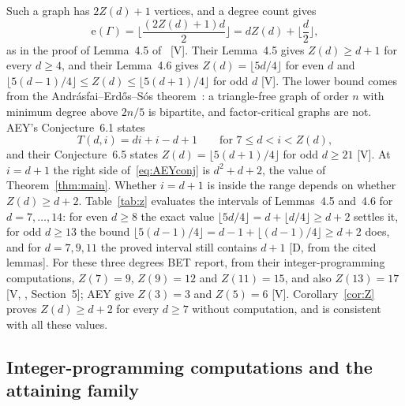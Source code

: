 \documentclass[11pt]{article}
\theoremstyle{remark}
\newcommand{\e}{\mathrm{e}}
\begin{document}
Such a graph has $2Z(d)+1$ vertices, and a degree count gives
\begin{equation}\label{eq:Zedges}
\e(\Gamma)=\Big\lfloor\frac{(2Z(d)+1)d}{2}\Big\rfloor=dZ(d)+\Big\lfloor\frac d2\Big\rfloor,
\end{equation}
as in the proof of Lemma~4.5 of~\cite{AEY} [V]. Their Lemma~4.5 gives $Z(d)\ge d+1$ for every $d\ge4$, and their Lemma~4.6 gives $Z(d)=\lfloor5d/4\rfloor$ for even $d$ and $\lfloor5(d-1)/4\rfloor\le Z(d)\le\lfloor5(d+1)/4\rfloor$ for odd $d$ [V]. The lower bound comes from the Andr\'asfai--Erd\H{o}s--S\'os theorem~\cite{AES}: a triangle-free graph of order $n$ with minimum degree above $2n/5$ is bipartite, and factor-critical graphs are not. AEY's Conjecture~6.1 states
\begin{equation}\label{eq:AEYconj}
T(d,i)=di+i-d+1\qquad\text{for }7\le d<i<Z(d),
\end{equation}
and their Conjecture~6.5 states $Z(d)=\lfloor5(d+1)/4\rfloor$ for odd $d\ge21$ [V]. At $i=d+1$ the right side of~\eqref{eq:AEYconj} is $d^2+d+2$, the value of Theorem~\ref{thm:main}. Whether $i=d+1$ is inside the range depends on whether $Z(d)\ge d+2$. Table~\ref{tab:z} evaluates the intervals of Lemmas~4.5 and~4.6 for $d=7,\ldots,14$: for even $d\ge8$ the exact value $\lfloor5d/4\rfloor=d+\lfloor d/4\rfloor\ge d+2$ settles it, for odd $d\ge13$ the bound $\lfloor5(d-1)/4\rfloor=d-1+\lfloor(d-1)/4\rfloor\ge d+2$ does, and for $d=7,9,11$ the proved interval still contains $d+1$ [D, from the cited lemmas]. For these three degrees BET report, from their integer-programming computations, $Z(7)=9$, $Z(9)=12$ and $Z(11)=15$, and also $Z(13)=17$ [V, \cite{BET}, Section~5]; AEY give $Z(3)=3$ and $Z(5)=6$ [V]. Corollary~\ref{cor:Z} proves $Z(d)\ge d+2$ for every $d\ge7$ without computation, and is consistent with all these values.

\begin{table}[ht]
\centering\small

\caption{Bounds on the threshold $Z(d)$ proved by Ahanjideh, Ekim and Y\i ld\i z (Lemmas 4.5 and 4.6 of their article) for $d=7,\ldots,14$, and whether those bounds alone give $d+1<Z(d)$. The odd degrees $7$, $9$ and $11$ are not decided by these bounds; the column of computed values gives the integer-programming values of Banak, Ekim and Ta\c{s}k\i n, and Corollary~\ref{cor:Z} proves $d+1<Z(d)$ for all of them without computation.}
\label{tab:z}
\end{table}

\subsection{Integer-programming computations and the attaining family}
\end{document}
